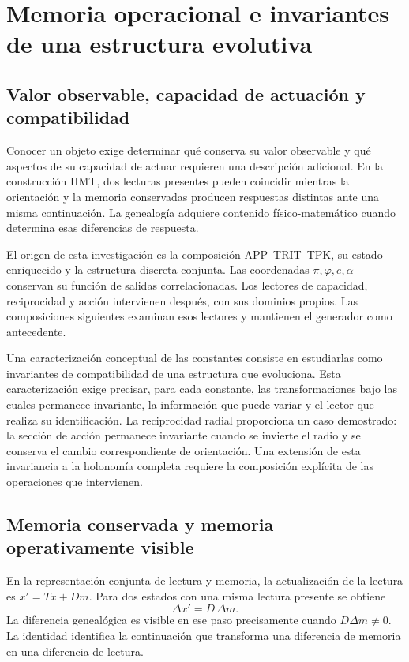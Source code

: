 \section{Memoria operacional e invariantes de una estructura evolutiva}
\label{md:lectin:seccion}

\subsection{Valor observable, capacidad de actuación y compatibilidad}
\label{md:lectin:valor}

Conocer un objeto exige determinar qué conserva su valor observable y qué
aspectos de su capacidad de actuar requieren una descripción adicional.
En la construcción HMT, dos lecturas presentes pueden coincidir mientras
la orientación y la memoria conservadas producen respuestas distintas
ante una misma continuación. La genealogía adquiere contenido
físico-matemático cuando determina esas diferencias de respuesta.

El origen de esta investigación es la composición APP--TRIT--TPK, su
estado enriquecido y la estructura discreta conjunta. Las coordenadas
$\pi,\varphi,e,\alpha$ conservan su función de salidas correlacionadas.
Los lectores de capacidad, reciprocidad y acción intervienen después,
con sus dominios propios. Las composiciones siguientes examinan esos
lectores y mantienen el generador como antecedente.

Una caracterización conceptual de las constantes consiste en estudiarlas
como invariantes de compatibilidad de una estructura que evoluciona.
Esta caracterización exige precisar, para cada constante, las
transformaciones bajo las cuales permanece invariante, la información
que puede variar y el lector que realiza su identificación. La
reciprocidad radial proporciona un caso demostrado: la sección de
acción permanece invariante cuando se invierte el radio y se conserva
el cambio correspondiente de orientación. Una extensión de esta
invariancia a la holonomía completa requiere la composición explícita
de las operaciones que intervienen.

\subsection{Memoria conservada y memoria operativamente visible}
\label{md:lectin:memoria-visible}

En la representación conjunta de lectura y memoria, la actualización
de la lectura es $x'=Tx+Dm$. Para dos estados con una misma lectura
presente se obtiene
\begin{equation}
 \Delta x'=D\,\Delta m.
 \label{md:lectin:diferencia-memoria}
\end{equation}
La diferencia genealógica es visible en ese paso precisamente cuando
$D\Delta m\ne0$. La identidad identifica la continuación que
transforma una diferencia de memoria en una diferencia de lectura.

